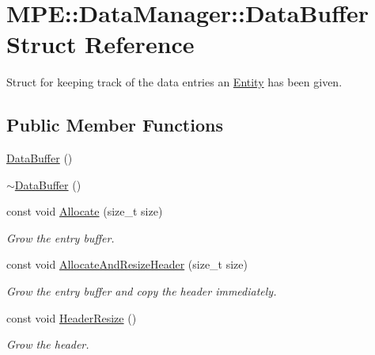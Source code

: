 \hypertarget{struct_m_p_e_1_1_data_manager_1_1_data_buffer}{}\section{M\+PE\+:\+:Data\+Manager\+:\+:Data\+Buffer Struct Reference}
\label{struct_m_p_e_1_1_data_manager_1_1_data_buffer}


Struct for keeping track of the data entries an \hyperlink{struct_m_p_e_1_1_entity}{Entity} has been given.  


\subsection*{Public Member Functions}
\begin{DoxyCompactItemize}
\item 
\hyperlink{struct_m_p_e_1_1_data_manager_1_1_data_buffer_a85b5e0404f7e7bd6a2e8553e4977fcf6}{Data\+Buffer} ()
\item 
\hyperlink{struct_m_p_e_1_1_data_manager_1_1_data_buffer_ab733041fb29f94e89140b54f20771d4d}{$\sim$\+Data\+Buffer} ()
\item 
const void \hyperlink{struct_m_p_e_1_1_data_manager_1_1_data_buffer_ad69fcbc429f31ea23b2fdb4cf3f1db47}{Allocate} (size\+\_\+t size)
\begin{DoxyCompactList}\small\item\em Grow the entry buffer. \end{DoxyCompactList}\item 
const void \hyperlink{struct_m_p_e_1_1_data_manager_1_1_data_buffer_a89e5af3756f1359588936a3adc5c4b03}{Allocate\+And\+Resize\+Header} (size\+\_\+t size)
\begin{DoxyCompactList}\small\item\em Grow the entry buffer and copy the header immediately. \end{DoxyCompactList}\item 
const void \hyperlink{struct_m_p_e_1_1_data_manager_1_1_data_buffer_aa0c025d4f28747a2168748f8a492928f}{Header\+Resize} ()
\begin{DoxyCompactList}\small\item\em Grow the header. \end{DoxyCompactList}\end{DoxyCompactItemize}

